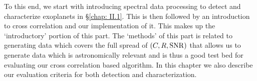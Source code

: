 To this end, we start with introducing spectral data processing to detect and characterize exoplanets in \S\ref{chap: II.1}.
This is then followed by an introduction to cross correlation and our implementation of it. 
This makes up the `introductory' portion of this part. 
The `methods' of this part is related to generating data which covers the full spread of $\left(C, R, \rm{SNR}\right)$\@
that allows us to generate data which is astronomically relevant and is thus a good test bed for evaluating our \@
cross correlation based algorithm.
In this chapter we also describe our evaluation criteria for both detection and characterization.
